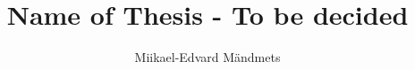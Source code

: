\documentclass[language=english,version=final,mainfont=none,sharelatex=false]{utuftthesis}
\providecommand{\algorithmname}{Algoritmi}
\begin{document}
\title{Name of Thesis - To be decided}
\author{Miikael-Edvard Mändmets}

\maketitle
% 

\tableofcontents















%
%


\printbibliography

\end{document}
